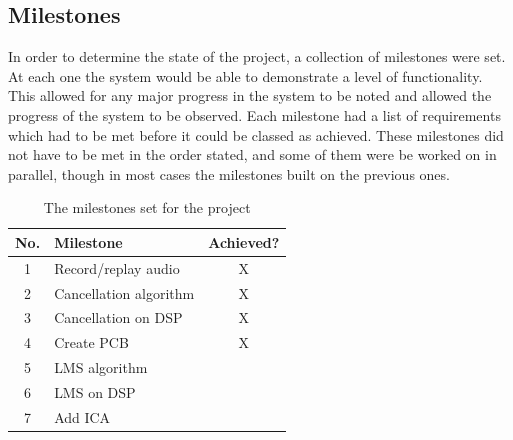 \subsection{Milestones}
In order to determine the state of the project, a collection of milestones were set.
At each one the system would be able to demonstrate a level of functionality.
This allowed for any major progress in the system to be noted and allowed the progress of the system to be observed.
Each milestone had a list of requirements which had to be met before it could be classed as achieved.
These milestones did not have to be met in the order stated, and some of them were be worked on in parallel, though in most cases the milestones built on the previous ones.

\begin{table}[H]
	\centering
	\begin{tabular}[c]{| c | l | c |}
		\hline
		No.	& Milestone		& Achieved? \\
		\hline
		1	& Record/replay audio	& X \\
		2	& Cancellation algorithm & X \\
		3	& Cancellation on DSP	& X \\
		4	& Create PCB		& X \\
		5	& LMS algorithm		& \\
		6	& LMS on DSP		& \\
		7	& Add ICA		& \\
		\hline
	\end{tabular}
	\caption{The milestones set for the project}
	\label{tab:milestones}
\end{table}
